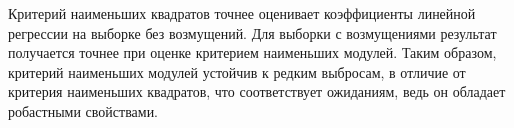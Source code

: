 \documentclass[../body.tex]{subfiles}
\begin{document}
	Критерий наименьших квадратов точнее оценивает коэффициенты линейной регрессии на выборке без возмущений. 
	\newline
	Для выборки с возмущениями результат получается точнее при оценке критерием наименьших модулей.
	\newline
	Таким образом, критерий наименьших модулей устойчив к редким выбросам, в отличие от критерия наименьших квадратов, что соответствует ожиданиям, ведь он обладает робастными свойствами.
\end{document}
